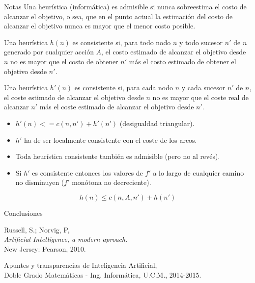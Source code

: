 \documentclass[11pt, a4paper, spanish, openright, twoside]{book}
\begin{document}
\begin{section}{Notas}
	Una heurística (informática) es admisible si nunca sobreestima el costo de alcanzar el objetivo, o sea, 
que en el punto actual la estimación del costo de alcanzar el objetivo nunca es mayor que el menor costo posible.

	Una heurística $h(n)$ es consistente si, para todo nodo $n$ y todo sucesor $n'$ de $n$ generado por cualquier acción $A$, el costo estimado de alcanzar el objetivo desde $n$ no es mayor que el costo de obtener $n'$ más el costo estimado de obtener el objetivo desde $n'$.

	Una heurística $h'(n)$ es consistente si, para cada nodo $n$ y cada sucesor $n'$ de $n$, el coste 
	estimado de alcanzar el objetivo desde $n$ no es mayor que el coste real de 
	alcanzar $n'$ más el coste estimado de alcanzar el objetivo desde $n'$.
		\begin{itemize}
		\item  $h'(n) <= c(n, n') + h'(n')$ (desigualdad triangular).
		\item  $h'$  ha de ser localmente consistente con el coste de los arcos.
		\item Toda heurística consistente también es admisible (pero no al revés).
		\item Si $h'$ es consistente entonces los valores de $f'$ a lo largo de cualquier 
		camino no disminuyen ($f'$ monótona no decreciente).
		\end{itemize}

$$h(n) \le c(n, A, n') + h(n')$$
\end{section}

\begin{section}{Conclusiones}
	
	
	
\end{section}

\begin{thebibliography}{9}

	Russell, S.; Norvig, P, \\
	\emph{Artificial Intelligence, a modern aproach}.\\
	New Jersey: Pearson, 2010.
	
	Apuntes y transparencias de Inteligencia Artificial, \\
	Doble Grado Matemáticas - Ing. Informática, U.C.M., 2014-2015.

\end{thebibliography}
\end{document}
